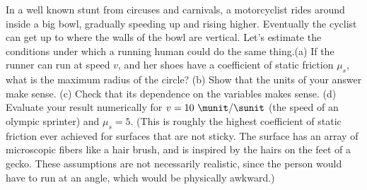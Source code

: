 In a well known stunt from circuses and carnivals, a motorcyclist rides around inside
a big bowl, gradually speeding up and rising higher. Eventually the cyclist can get
up to where the walls of the bowl are vertical. Let's estimate the conditions under
which a running human could do the same thing.\hwendpart (a) If the runner can run
at speed $v$, and her shoes have a coefficient of static friction $\mu_s$, what is
the maximum radius of the circle?\answercheck\hwendpart
%
(b) Show that the units of your answer make sense.\hwendpart
%
(c) Check that its dependence on the variables makes sense.\hwendpart
%
(d) Evaluate your result numerically for
$v=10\ \munit/\sunit$ (the speed of an olympic sprinter) and $\mu_s=5$. (This is
roughly the highest coefficient of static friction ever achieved for surfaces that
are not sticky. The surface has an array of microscopic fibers like a hair brush,
and is inspired by the hairs on the feet of a gecko. These assumptions are not
necessarily realistic, since the person would have to run at an angle, which would
be physically awkward.)\answercheck\hwendpart
